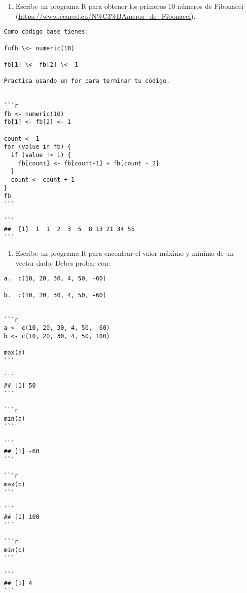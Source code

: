 \documentclass[
]{article}
\providecommand{\tightlist}{%
  \setlength{\itemsep}{0pt}\setlength{\parskip}{0pt}}
\begin{document}
\begin{enumerate}
\def\labelenumi{\arabic{enumi}.}
\setcounter{enumi}{4}
\tightlist
\item
  Escribe un programa R para obtener los primeros 10 números de
  Fibonacci (\url{https://www.ecured.cu/N\%C3\%BAmeros_de_Fibonacci}).
\end{enumerate}

\begin{verbatim}
Como código base tienes:

fufb \<- numeric(10)

fb[1] \<- fb[2] \<- 1

Practica usando un for para terminar tu código.


```r
fb <- numeric(10)
fb[1] <- fb[2] <- 1

count <- 1
for (value in fb) {
  if (value != 1) {
    fb[count] <- fb[count-1] + fb[count - 2]
  }
  count <- count + 1
}
fb
```

```
##  [1]  1  1  2  3  5  8 13 21 34 55
```
\end{verbatim}

\begin{enumerate}
\def\labelenumi{\arabic{enumi}.}
\setcounter{enumi}{5}
\tightlist
\item
  Escribe un programa R para encontrar el valor máximo y mínimo de un
  vector dado. Debes probar con:
\end{enumerate}

\begin{verbatim}
a.  c(10, 20, 30, 4, 50, -60)

b.  c(10, 20, 30, 4, 50, -60)


```r
a <- c(10, 20, 30, 4, 50, -60)
b <- c(10, 20, 30, 4, 50, 100) 

max(a)
```

```
## [1] 50
```

```r
min(a)
```

```
## [1] -60
```

```r
max(b)
```

```
## [1] 100
```

```r
min(b)
```

```
## [1] 4
```
\end{verbatim}
\end{document}
